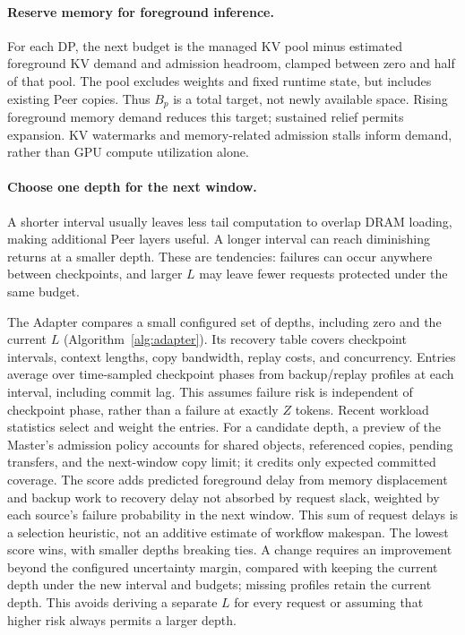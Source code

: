 \paragraph{Reserve memory for foreground inference.}
For each DP, the next budget is the managed KV pool minus estimated
foreground KV demand and admission headroom, clamped between zero and
half of that pool. The pool excludes weights and fixed runtime state,
but includes existing Peer copies. Thus $B_p$ is a total target, not
newly available space. Rising foreground memory demand reduces this
target; sustained relief permits expansion. KV watermarks and
memory-related admission stalls inform demand, rather than GPU compute
utilization alone.

\paragraph{Choose one depth for the next window.}
A shorter interval usually leaves less tail computation to overlap
DRAM loading, making additional Peer layers useful. A longer interval
can reach diminishing returns at a smaller depth. These are tendencies:
failures can occur anywhere between checkpoints, and larger $L$ may
leave fewer requests protected under the same budget.

The Adapter compares a small configured set of depths, including zero
and the current $L$ (Algorithm~\ref{alg:adapter}). Its recovery table
covers checkpoint intervals, context lengths, copy bandwidth, replay
costs, and concurrency. Entries average over time-sampled checkpoint
phases from backup/replay profiles at each interval, including commit
lag. This assumes failure risk is independent of checkpoint phase,
rather than a failure at exactly $Z$ tokens. Recent workload statistics
select and weight the entries.
For a candidate depth, a preview of the Master's admission policy
accounts for shared objects, referenced copies, pending transfers, and
the next-window copy limit; it credits only expected committed coverage.
The score adds predicted foreground delay from memory displacement and
backup work to recovery delay not absorbed by request slack, weighted
by each source's failure probability in the next window. This sum of request delays is a
selection heuristic, not an additive estimate of workflow makespan.
The lowest score wins, with smaller depths breaking ties. A change
requires an improvement beyond the configured uncertainty margin,
compared with keeping the current depth under the new interval and budgets;
missing profiles retain the current depth. This avoids deriving a
separate $L$ for every request or assuming that higher risk always
permits a larger depth.

